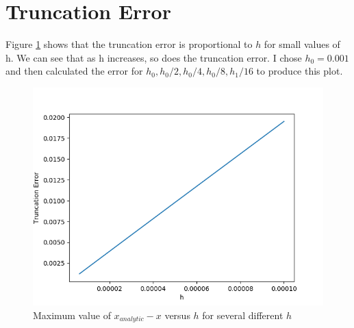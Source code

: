 \documentclass{article}
\begin{document}
\section{Truncation Error}
Figure \ref{fig:truncerror} shows that the truncation error is proportional to $h$ for small values of h. We can see that as h increases, so does the truncation error. I chose $h_0=0.001$ and then calculated the error for $h_0,h_0/2,h_0/4,h_0/8,h_1/16$ to produce this plot. 
\begin{figure}[h]
    \centering
    \includegraphics[width = \textwidth]{Images/truncerror.png}
    \caption{Maximum value of $x_{analytic}-x$ versus $h$ for several different $h$}
    \label{fig:truncerror}
\end{figure}
\end{document}
